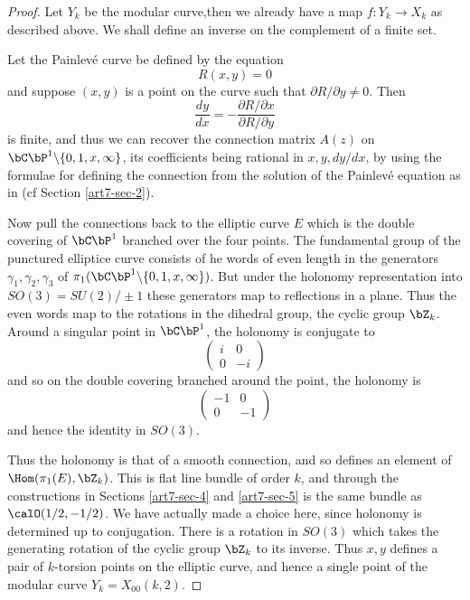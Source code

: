 \begin{proof}
Let $Y_{k}$ be the modular curve,then we already have a map $f : Y_{k}\rightarrow X_{k}$ as described above. We shall define an inverse on the complement of a finite set.

Let the Painlev\'e curve be defined by the equation
$$
R(x,y)=0
$$
and suppose $(x,y)$ is a point on the curve such that $\partial R/\partial y \neq 0$. Then
$$
\dfrac{dy}{dx}= -\dfrac{\partial R /\partial x}{\partial R/ \partial y}
$$
is finite, and thus we can recover the connection matrix $A(z)$ on\break $\bC\bP^{1}\backslash \{0,1,x, \infty\}$, its coefficients being rational in $x,y, dy/dx$, by using the formulae for defining the connection from the solution of the Painlev\'e equation as in \cite{art7-key8} (cf Section \ref{art7-sec-2}).

Now pull the connections back to the elliptic curve $E$ which is the double covering of $\bC\bP^{1}$ branched over the four points. The fundamental group of the punctured elliptice curve consists of he words of even length in the generators $\gamma_{1}, \gamma_{2}, \gamma_{3}$ of $\pi_{1}(\bC\bP^{1}\backslash \{0,1,x,\infty\})$. But under the holonomy representation into $SO(3)=SU(2)/\pm 1$ these generators map to reflections in a plane. Thus the even words map to the rotations in the dihedral group, the cyclic group $\bZ_{k}$. Around a singular point in $\bC\bP^{1}$, the holonomy is conjugate to
$$
\begin{pmatrix}
 i & 0\\
 0 & -i
\end{pmatrix}
$$
and so on the double covering branched around the point, the holonomy is
$$
\begin{pmatrix}
 -1 & 0\\
 0 & -1
\end{pmatrix}
$$
and hence the identity in $SO(3)$.

Thus the holonomy is that of a smooth connection, and so defines an element of $\Hom(\pi_{1}(E), \bZ_{k})$. This is flat line bundle of order $k$, and through the constructions in Sections \ref{art7-sec-4} and \ref{art7-sec-5} is the same bundle as $\calO(1/2, -1/2)$. We have actually made a choice here, since holonomy is determined up to
 conjugation. There is a rotation in $SO(3)$ which takes the generating rotation of the cyclic group $\bZ_{k}$ to its inverse. Thus $x,y$ defines a pair of $k$-torsion points on the elliptic curve, and hence a single point of the modular curve $Y_{k} = X_{00}(k,2)$.
\end{proof}


